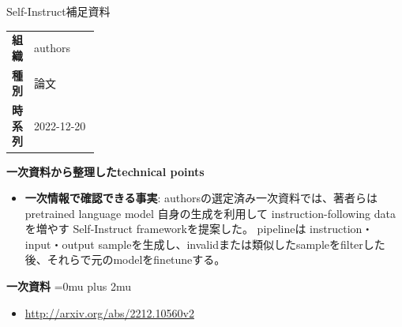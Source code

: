 \begin{technicalnote}{Self-Instruct}{補足資料}
\begingroup
\begin{tabularx}{\linewidth}{@{}>{\bfseries}p{0.22\linewidth}X@{}}
組織 & authors \\
種別 & 論文 \\
時系列 & 2022-12-20 \\
\end{tabularx}
\smallskip
{\bfseries 一次資料から整理したtechnical points}
\begin{itemize}[leftmargin=1.5em,itemsep=0.35em]
\item \textbf{一次情報で確認できる事実}: authorsの選定済み一次資料では、著者らは pretrained language model 自身の生成を利用して instruction-following data を増やす Self-Instruct frameworkを提案した。 pipelineは instruction・input・output sampleを生成し、invalidまたは類似したsampleをfilterした後、それらで元のmodelをfinetuneする。
\end{itemize}
\begin{minipage}{\linewidth}
\begin{samepage}
{\bfseries 一次資料}
\begingroup\sloppy
\Urlmuskip=0mu plus 2mu\relax
\begin{itemize}[leftmargin=1.5em,itemsep=0.25em]
\item {\scriptsize\url{http://arxiv.org/abs/2212.10560v2}}
\end{itemize}
\endgroup
\end{samepage}
\end{minipage}
\endgroup
\end{technicalnote}
\medskip
